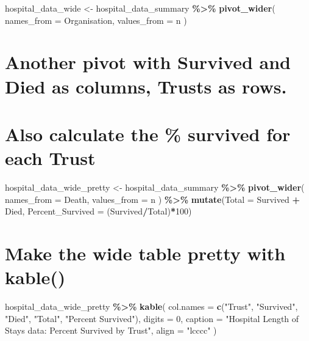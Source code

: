 \documentclass[
]{article}
\newenvironment{Shaded}{\begin{snugshade}}{\end{snugshade}}
\newcommand{\AttributeTok}[1]{\textcolor[rgb]{0.13,0.29,0.53}{#1}}
\newcommand{\DecValTok}[1]{\textcolor[rgb]{0.00,0.00,0.81}{#1}}
\newcommand{\FunctionTok}[1]{\textcolor[rgb]{0.13,0.29,0.53}{\textbf{#1}}}
\newcommand{\NormalTok}[1]{#1}
\newcommand{\OtherTok}[1]{\textcolor[rgb]{0.56,0.35,0.01}{#1}}
\newcommand{\SpecialCharTok}[1]{\textcolor[rgb]{0.81,0.36,0.00}{\textbf{#1}}}
\newcommand{\StringTok}[1]{\textcolor[rgb]{0.31,0.60,0.02}{#1}}
\begin{document}
\begin{Shaded}
\begin{Highlighting}[]
\NormalTok{hospital\_data\_wide }\OtherTok{\textless{}{-}}\NormalTok{ hospital\_data\_summary }\SpecialCharTok{\%\textgreater{}\%} 
  \FunctionTok{pivot\_wider}\NormalTok{(}
    \AttributeTok{names\_from =}\NormalTok{ Organisation,}
    \AttributeTok{values\_from =}\NormalTok{ n}
\NormalTok{  )}
\end{Highlighting}
\end{Shaded}

\section{Another pivot with Survived and Died as columns, Trusts as
rows.}\label{another-pivot-with-survived-and-died-as-columns-trusts-as-rows.}

\section{Also calculate the \% survived for each
Trust}\label{also-calculate-the-survived-for-each-trust}

\begin{Shaded}
\begin{Highlighting}[]
\NormalTok{hospital\_data\_wide\_pretty }\OtherTok{\textless{}{-}}\NormalTok{ hospital\_data\_summary }\SpecialCharTok{\%\textgreater{}\%} 
  \FunctionTok{pivot\_wider}\NormalTok{(}
    \AttributeTok{names\_from =}\NormalTok{ Death,}
    \AttributeTok{values\_from =}\NormalTok{ n}
\NormalTok{  ) }\SpecialCharTok{\%\textgreater{}\%} 
  \FunctionTok{mutate}\NormalTok{(}\AttributeTok{Total =}\NormalTok{ Survived }\SpecialCharTok{+}\NormalTok{ Died,}
         \AttributeTok{Percent\_Survived =}\NormalTok{ (Survived}\SpecialCharTok{/}\NormalTok{Total)}\SpecialCharTok{*}\DecValTok{100}\NormalTok{)}
\end{Highlighting}
\end{Shaded}

\section{Make the wide table pretty with
kable()}\label{make-the-wide-table-pretty-with-kable}

\begin{Shaded}
\begin{Highlighting}[]
\NormalTok{hospital\_data\_wide\_pretty }\SpecialCharTok{\%\textgreater{}\%} 
  \FunctionTok{kable}\NormalTok{(}
    \AttributeTok{col.names =} \FunctionTok{c}\NormalTok{(}\StringTok{"Trust"}\NormalTok{, }\StringTok{"Survived"}\NormalTok{, }\StringTok{"Died"}\NormalTok{, }\StringTok{"Total"}\NormalTok{, }\StringTok{"Percent Survived"}\NormalTok{),}
    \AttributeTok{digits =} \DecValTok{0}\NormalTok{,}
    \AttributeTok{caption =} \StringTok{"Hospital Length of Stays data: Percent Survived by Trust"}\NormalTok{,}
    \AttributeTok{align =} \StringTok{"lcccc"}
\NormalTok{  )}
\end{Highlighting}
\end{Shaded}
\end{document}
